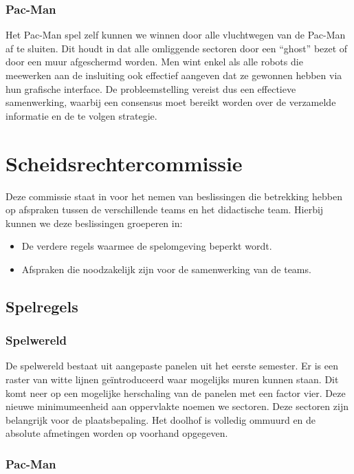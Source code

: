 \documentclass[12pt,a4paper]{report}
\begin{document}
\subsection{Pac-Man}

Het Pac-Man spel zelf kunnen we winnen door alle vluchtwegen van de Pac-Man af te sluiten. Dit houdt in dat alle omliggende sectoren door een ``ghost'' bezet of door een muur afgeschermd worden. Men wint enkel als alle robots die meewerken aan de insluiting ook effectief aangeven dat ze gewonnen hebben via hun grafische interface. De probleemstelling vereist dus een effectieve samenwerking, waarbij een consensus moet bereikt worden over de verzamelde informatie en de te volgen strategie.

\chapter{Scheidsrechtercommissie}

Deze commissie staat in voor het nemen van beslissingen die betrekking hebben op afspraken tussen de verschillende teams en het didactische team. Hierbij kunnen we deze beslissingen groeperen in:

\begin{itemize}
	\item De verdere regels waarmee de spelomgeving beperkt wordt.
	\item Afspraken die noodzakelijk zijn voor de samenwerking van de teams.
\end{itemize}

\section{Spelregels}

\subsection{Spelwereld}

De spelwereld bestaat uit aangepaste panelen uit het eerste semester. Er is een raster van witte lijnen ge\"introduceerd waar mogelijks muren kunnen staan. Dit komt neer op een mogelijke herschaling van de panelen met een factor vier. Deze nieuwe minimumeenheid aan oppervlakte noemen we sectoren. Deze sectoren zijn belangrijk voor de plaatsbepaling. Het doolhof is volledig ommuurd en de absolute afmetingen worden op voorhand opgegeven.

\subsection{Pac-Man}
\end{document}
